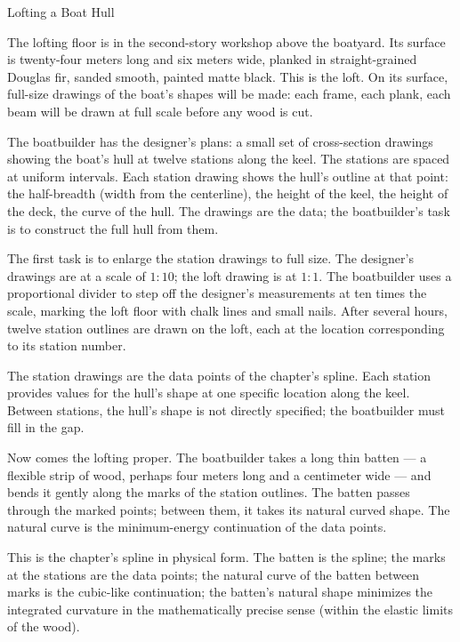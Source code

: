 \begin{coda}{Lofting a Boat Hull}

The lofting floor is in the second-story workshop above the boatyard.
Its surface is twenty-four meters long and six meters wide, planked
in straight-grained Douglas fir, sanded smooth, painted matte black.
This is the loft. On its surface, full-size drawings of the boat's
shapes will be made: each frame, each plank, each beam will be drawn
at full scale before any wood is cut.

The boatbuilder has the designer's plans: a small set of cross-section
drawings showing the boat's hull at twelve stations along the keel. The
stations are spaced at uniform intervals. Each station drawing shows
the hull's outline at that point: the half-breadth (width from the
centerline), the height of the keel, the height of the deck, the
curve of the hull. The drawings are the data; the boatbuilder's task
is to construct the full hull from them.

The first task is to enlarge the station drawings to full size. The
designer's drawings are at a scale of $1:10$; the loft drawing is at
$1:1$. The boatbuilder uses a proportional divider to step off the
designer's measurements at ten times the scale, marking the loft
floor with chalk lines and small nails. After several hours, twelve
station outlines are drawn on the loft, each at the location
corresponding to its station number.

The station drawings are the data points of the chapter's spline. Each
station provides values for the hull's shape at one specific location
along the keel. Between stations, the hull's shape is not directly
specified; the boatbuilder must fill in the gap.

Now comes the lofting proper. The boatbuilder takes a long thin
batten --- a flexible strip of wood, perhaps four meters long and a
centimeter wide --- and bends it gently along the marks of the station
outlines. The batten passes through the marked points; between them,
it takes its natural curved shape. The natural curve is the
minimum-energy continuation of the data points.

This is the chapter's spline in physical form. The batten is the
spline; the marks at the stations are the data points; the natural
curve of the batten between marks is the cubic-like continuation;
the batten's natural shape minimizes the integrated curvature in the
mathematically precise sense (within the elastic limits of the
wood).


\end{coda}
